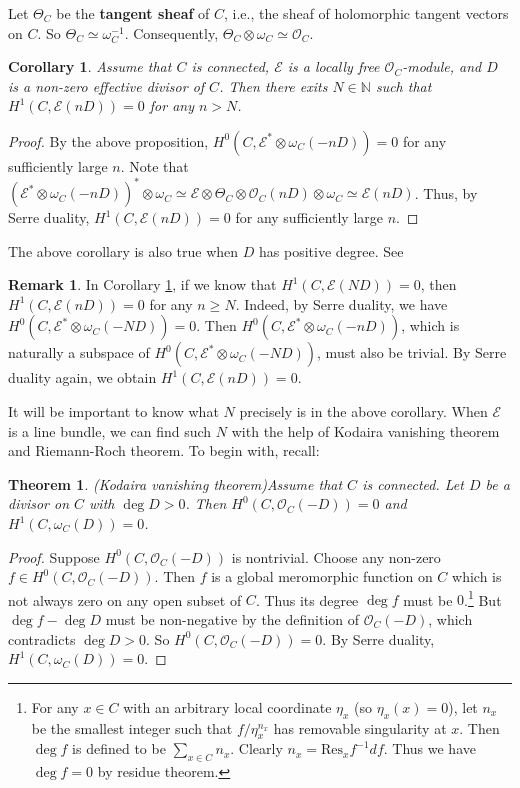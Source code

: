 \documentclass[12pt,b5paper,notitlepage]{report}
\theoremstyle{definition}
\newtheorem{rem}[df]{Remark}
\theoremstyle{plain}
\newtheorem{thm}[df]{Theorem}
\newtheorem{co}[df]{Corollary}
\newcommand{\Res}{\mathrm{Res}}
\newcommand{\scr}{\mathscr}
\numberwithin{equation}{section}
\begin{document}
Let $\Theta_C$ be the  \textbf{tangent sheaf} of $C$,  i.e., the sheaf of holomorphic tangent vectors on $C$. So $\Theta_C\simeq\omega_C^{-1}$. Consequently, $\Theta_C\otimes\omega_C\simeq\scr O_C$.


\begin{co}\label{lb6}
Assume that $C$ is connected,  $\scr E$ is a locally free $\scr O_C$-module, and  $D$ is a non-zero effective divisor of $C$. Then   there exits $N\in\mathbb N$ such that $H^1(C,\scr E(nD))=0$ for any $n> N$.
\end{co}

\begin{proof}
By the above proposition, $H^0(C,\scr E^*\otimes\omega_C(-nD))=0$ for any sufficiently large $n$. Note that $(\scr E^*\otimes\omega_C(-nD))^*\otimes\omega_C\simeq\scr E\otimes\Theta_C\otimes\scr O_C(nD)\otimes\omega_C\simeq \scr E(nD)$. Thus, by Serre duality, $H^1(C,\scr E(nD))=0$ for any sufficiently large $n$.
\end{proof}

The above corollary is also true when $D$ has positive degree. See \cite[Prop. 5.2.7]{Huy06}


\begin{rem}\label{lb128}
In Corollary \ref{lb6}, if we know that $H^1(C,\scr E(ND))=0$, then $H^1(C,\scr E(nD))=0$ for any $n\geq N$. Indeed, by Serre duality, we have $H^0(C,\scr E^*\otimes\omega_C(-ND))=0$. Then $H^0(C,\scr E^*\otimes\omega_C(-nD))$, which is naturally a subspace of $H^0(C,\scr E^*\otimes\omega_C(-ND))$, must also be trivial. By Serre duality again, we obtain $H^1(C,\scr E(nD))=0$.
\end{rem}


It will be important to know what $N$ precisely is in the above corollary. When $\scr E$ is a line bundle, we can find such $N$ with the help of Kodaira vanishing theorem and Riemann-Roch theorem. To begin with, recall:



\begin{thm}(Kodaira vanishing theorem)\label{lb64}
Assume that $C$ is connected. Let $D$ be a divisor on $C$ with $\deg D>0$. Then $H^0(C,\scr O_C(-D))=0$ and $H^1(C,\omega_C(D))=0$.
\end{thm}

\begin{proof}
Suppose $H^0(C,\scr O_C(-D))$ is nontrivial.  Choose any non-zero $f\in H^0(C,\scr O_C(-D))$. Then $f$ is a global meromorphic function on $C$ which is not always zero on any open subset of $C$. Thus its degree $\deg f$ must be $0$.\footnote{For any $x\in C$ with an arbitrary local coordinate $\eta_x$ (so $\eta_x(x)=0$), let $n_x$ be the smallest integer such that $f/\eta_x^{n_x}$ has removable singularity at $x$. Then $\deg f$ is defined to be $\sum_{x\in C} n_x$. Clearly $n_x=\Res_x f^{-1}df$. Thus we have $\deg f=0$ by residue theorem.} But $\deg f-\deg D$ must be non-negative by the definition of $\scr O_C(-D)$, which contradicts $\deg D>0$. So $H^0(C,\scr O_C(-D))=0$. By Serre duality, $H^1(C,\omega_C(D))=0$.
\end{proof}
\end{document}
